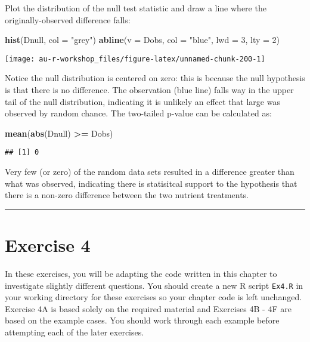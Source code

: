 \documentclass[]{book}
\newenvironment{Shaded}{\begin{snugshade}}{\end{snugshade}}
\newcommand{\KeywordTok}[1]{\textcolor[rgb]{0.13,0.29,0.53}{\textbf{#1}}}
\newcommand{\DataTypeTok}[1]{\textcolor[rgb]{0.13,0.29,0.53}{#1}}
\newcommand{\DecValTok}[1]{\textcolor[rgb]{0.00,0.00,0.81}{#1}}
\newcommand{\StringTok}[1]{\textcolor[rgb]{0.31,0.60,0.02}{#1}}
\newcommand{\OperatorTok}[1]{\textcolor[rgb]{0.81,0.36,0.00}{\textbf{#1}}}
\newcommand{\NormalTok}[1]{#1}
\theoremstyle{definition}
\theoremstyle{definition}
\theoremstyle{definition}
\theoremstyle{remark}
\begin{document}
Plot the distribution of the null test statistic and draw a line where
the originally-observed difference falls:

\begin{Shaded}
\begin{Highlighting}[]
\KeywordTok{hist}\NormalTok{(Dnull, }\DataTypeTok{col =} \StringTok{"grey"}\NormalTok{)}
\KeywordTok{abline}\NormalTok{(}\DataTypeTok{v =}\NormalTok{ Dobs, }\DataTypeTok{col =} \StringTok{"blue"}\NormalTok{, }\DataTypeTok{lwd =} \DecValTok{3}\NormalTok{, }\DataTypeTok{lty =} \DecValTok{2}\NormalTok{)}
\end{Highlighting}
\end{Shaded}

\begin{center}\texttt{[image: au-r-workshop\_files/figure-latex/unnamed-chunk-200-1]} \end{center}

Notice the null distribution is centered on zero: this is because the
null hypothesis is that there is no difference. The observation (blue
line) falls way in the upper tail of the null distribution, indicating
it is unlikely an effect that large was observed by random chance. The
two-tailed p-value can be calculated as:

\begin{Shaded}
\begin{Highlighting}[]
\KeywordTok{mean}\NormalTok{(}\KeywordTok{abs}\NormalTok{(Dnull) }\OperatorTok{>=}\StringTok{ }\NormalTok{Dobs)}
\end{Highlighting}
\end{Shaded}

\begin{verbatim}
## [1] 0
\end{verbatim}

Very few (or zero) of the random data sets resulted in a difference
greater than what was observed, indicating there is statisitcal support
to the hypothesis that there is a non-zero difference between the two
nutrient treatments.

\begin{center}\rule{0.5\linewidth}{\linethickness}\end{center}

\section{Exercise 4}\label{exercise-4}

In these exercises, you will be adapting the code written in this
chapter to investigate slightly different questions. You should create a
new R script \texttt{Ex4.R} in your working directory for these
exercises so your chapter code is left unchanged. Exercise 4A is based
solely on the required material and Exercises 4B - 4F are based on the
example cases. You should work through each example before attempting
each of the later exercises.
\end{document}
